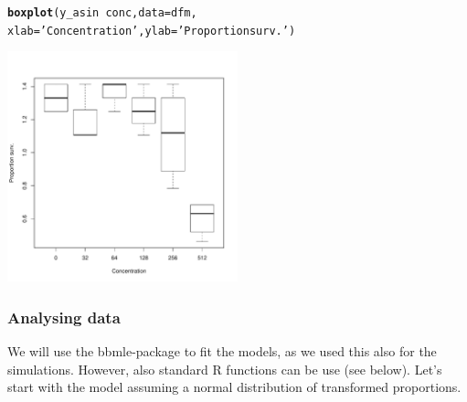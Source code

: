 \documentclass{scrartcl}\usepackage[]{graphicx}\usepackage[]{color}
\makeatletter
\newcommand{\hlstr}[1]{\textcolor[rgb]{0.192,0.494,0.8}{#1}}%
\newcommand{\hlopt}[1]{\textcolor[rgb]{0,0,0}{#1}}%
\newcommand{\hlstd}[1]{\textcolor[rgb]{0.345,0.345,0.345}{#1}}%
\newcommand{\hlkwc}[1]{\textcolor[rgb]{0.333,0.667,0.333}{#1}}%
\newcommand{\hlkwd}[1]{\textcolor[rgb]{0.737,0.353,0.396}{\textbf{#1}}}%
\newenvironment{kframe}{%
 \def\at@end@of@kframe{}%
 \ifinner\ifhmode%
  \def\at@end@of@kframe{\end{minipage}}%
  \begin{minipage}{\columnwidth}%
 \fi\fi%
 \def\FrameCommand##1{\hskip\@totalleftmargin \hskip-\fboxsep
 \colorbox{shadecolor}{##1}\hskip-\fboxsep
     \hskip-\linewidth \hskip-\@totalleftmargin \hskip\columnwidth}%
 \MakeFramed {\advance\hsize-\width
   \@totalleftmargin\z@ \linewidth\hsize
   \@setminipage}}%
 {\par\unskip\endMakeFramed%
 \at@end@of@kframe}
\newenvironment{knitrout}{}{} %
\makeatother
\begin{document}
\begin{knitrout}
\color{fgcolor}\begin{kframe}
\begin{alltt}
\hlkwd{boxplot}\hlstd{(y_asin} \hlopt{~} \hlstd{conc,} \hlkwc{data} \hlstd{= dfm,}
        \hlkwc{xlab} \hlstd{=} \hlstr{'Concentration'}\hlstd{,} \hlkwc{ylab} \hlstd{=} \hlstr{'Proportion surv.'}\hlstd{)}
\end{alltt}
\end{kframe}
\includegraphics[width=0.5\textwidth]{figure/bin_trans_plot} 

\end{knitrout}

\subsubsection{Analysing data}
We will use the bbmle-package  to fit the models, as we used this also for the simulations.
However, also standard R functions can be use (see below).
Let's start with the model assuming a normal distribution of transformed proportions.
\end{document}
